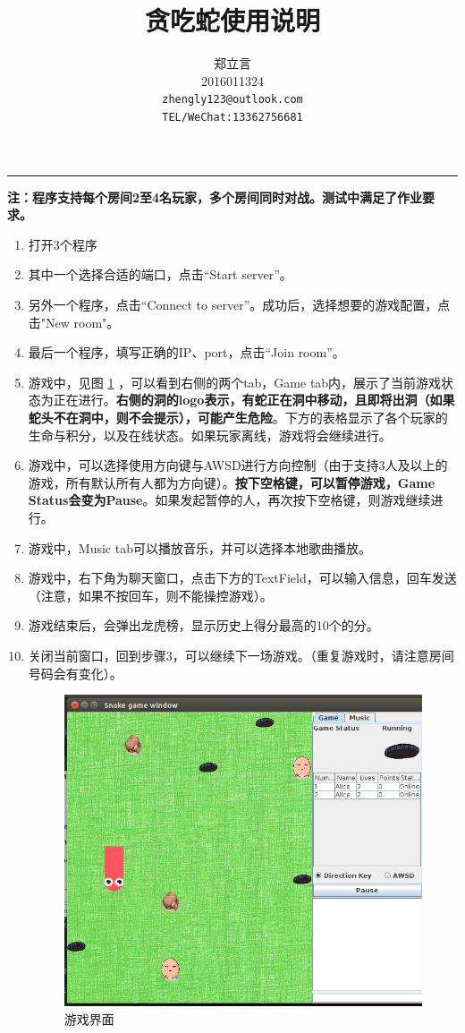 \documentclass[12pt]{article}
\title{贪吃蛇使用说明}
\author{郑立言 \\
	2016011324\\
	 \texttt{zhengly123@outlook.com}\\
	 \texttt{TEL/WeChat:13362756681}}
\begin{document}
  \maketitle
  \rule{\linewidth}{0.4pt}
  
  \textbf{注：程序支持每个房间2至4名玩家，多个房间同时对战。测试中满足了作业要求。}
  \begin{enumerate}
  	
  	
  	\item 打开3个程序
  	\item 其中一个选择合适的端口，点击“Start server”。
  	\item 另外一个程序，点击“Connect to server”。成功后，选择想要的游戏配置，点击"New room"。
  	\item 最后一个程序，填写正确的IP、port，点击“Join room”。
  	\item 游戏中，见图 \ref{fig:inHole} ，可以看到右侧的两个tab，Game tab内，展示了当前游戏状态为正在进行。\textbf{右侧的洞的logo表示，有蛇正在洞中移动，且即将出洞（如果蛇头不在洞中，则不会提示），可能产生危险}。下方的表格显示了各个玩家的生命与积分，以及在线状态。如果玩家离线，游戏将会继续进行。
  	\item 游戏中，可以选择使用方向键与AWSD进行方向控制（由于支持3人及以上的游戏，所有默认所有人都为方向键）。\textbf{按下空格键，可以暂停游戏，Game Status会变为Pause}。如果发起暂停的人，再次按下空格键，则游戏继续进行。
  	
  	\item 游戏中，Music tab可以播放音乐，并可以选择本地歌曲播放。
  	\item 游戏中，右下角为聊天窗口，点击下方的TextField，可以输入信息，回车发送（注意，如果不按回车，则不能操控游戏）。
  	\item 游戏结束后，会弹出龙虎榜，显示历史上得分最高的10个的分。
  	\item 关闭当前窗口，回到步骤3，可以继续下一场游戏。（重复游戏时，请注意房间号码会有变化）。
  	
  	
  	
  	\begin{figure}[h]
  		\centering
  		\includegraphics[width=0.7\linewidth]{inHole}
  		\caption{游戏界面}
  		\label{fig:inHole}
  	\end{figure}
  \end{enumerate}
  
\end{document}

